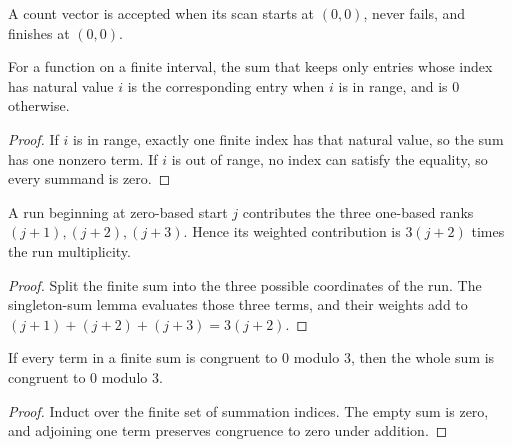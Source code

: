 \begin{definition}
  \label{def:scan_accepts}
  A count vector is accepted when its scan starts at \((0,0)\), never
  fails, and finishes at \((0,0)\).
\end{definition}

\begin{lemma}

  \label{lem:sum_if_fin_val_eq}
  For a function on a finite interval, the sum that keeps only entries
  whose index has natural value \(i\) is the corresponding entry when
  \(i\) is in range, and is \(0\) otherwise.
\end{lemma}
\begin{proof}

\leanok
  If \(i\) is in range, exactly one finite index has that natural value,
  so the sum has one nonzero term.  If \(i\) is out of range, no index can
  satisfy the equality, so every summand is zero.
\end{proof}

\begin{lemma}

  \label{lem:run_weight_sum}
  A run beginning at zero-based start \(j\) contributes the three
  one-based ranks \((j+1),(j+2),(j+3)\).  Hence its weighted contribution
  is \(3(j+2)\) times the run multiplicity.
\end{lemma}
\begin{proof}

\leanok
  Split the finite sum into the three possible coordinates of the run.
  The singleton-sum lemma evaluates those three terms, and their weights
  add to \((j+1)+(j+2)+(j+3)=3(j+2)\).
\end{proof}

\begin{lemma}

  \label{lem:sum_modEq_zero}
  If every term in a finite sum is congruent to \(0\) modulo \(3\), then
  the whole sum is congruent to \(0\) modulo \(3\).
\end{lemma}
\begin{proof}

\leanok
  Induct over the finite set of summation indices.  The empty sum is zero,
  and adjoining one term preserves congruence to zero under addition.
\end{proof}

